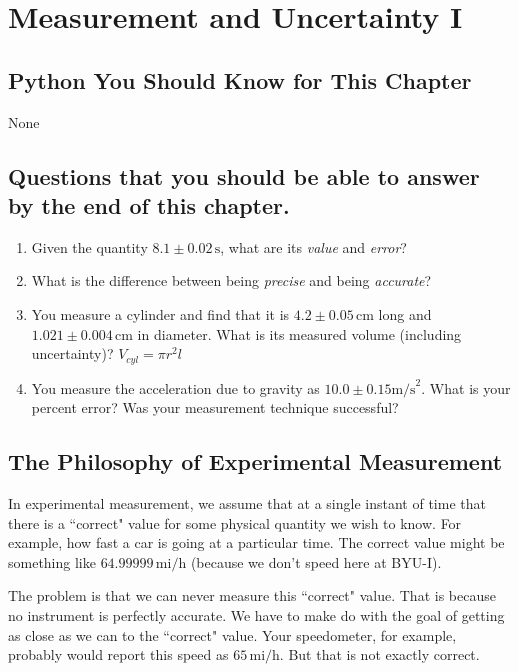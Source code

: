 \documentclass[twoside,11pt,ShortChapTitles]{BYUTextbook}
\begin{document}
\chapter{Measurement and Uncertainty I\label{Measurement and Uncertainty 1}}

\setcounter{page}{1}
\section*{Python You Should Know for This Chapter}
None

\section*{Questions that you should be able to answer by the end of this chapter.}
\begin{enumerate}
\item Given the quantity $8.1\pm0.02\, \text{s}$, what are its {\em value} and {\em error}?

\item What is the difference between being {\em precise} and being {\em accurate}?

\item You measure a cylinder and find that it is $4.2\pm0.05\,\text{cm}$ long and $1.021\pm0.004\,\text{cm}$ in diameter. What is its measured volume (including uncertainty)?  $V_{cyl}=\pi r^2l$

\item You measure the acceleration due to gravity as $10.0 \pm 0.15 \text{m/s}^2$.  What is your percent error?  Was your measurement technique successful?
\end{enumerate}
\hrulefill

\section{The Philosophy of Experimental Measurement}

In experimental measurement, we assume that at a single instant of time that there
is a ``correct" value for some physical
quantity we wish to know. For example, how fast a car is going at a particular
time. The correct value might be something like $64.99999\,\text{mi}/\text{h}$ (because we don't speed here at BYU-I).

The problem is that we can never measure this ``correct" value. That is because no instrument is perfectly
accurate. We have to make do with the goal of getting as close as we can to
the ``correct" value. Your speedometer, for
example, probably would report this speed as $65\,\text{mi}/\text{h}$. But that is not exactly correct.
\end{document}
